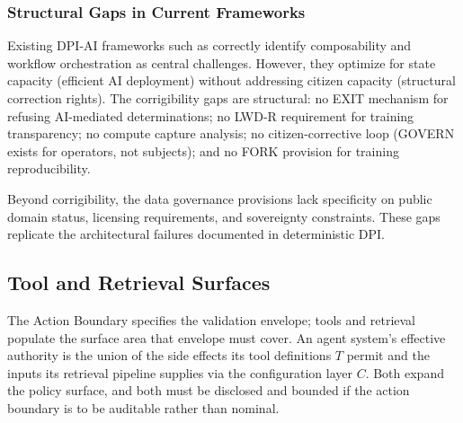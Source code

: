 \documentclass{article}
\theoremstyle{definition}
\begin{document}
\subsubsection{Structural Gaps in Current Frameworks}
\label{subsec:cdpi-critique}

Existing DPI-AI frameworks such as \citet{abadie2026} correctly identify composability and workflow orchestration as central challenges. However, they optimize for state capacity (efficient AI deployment) without addressing citizen capacity (structural correction rights). The corrigibility gaps are structural: no EXIT mechanism for refusing AI-mediated determinations; no LWD-R requirement for training transparency; no compute capture analysis; no citizen-corrective loop (GOVERN exists for operators, not subjects); and no FORK provision for training reproducibility.

Beyond corrigibility, the data governance provisions lack specificity on public domain status, licensing requirements, and sovereignty constraints. These gaps replicate the architectural failures documented in deterministic DPI.

\subsection{Tool and Retrieval Surfaces}
\label{subsec:tool-retrieval-surfaces}

The Action Boundary specifies the validation envelope; tools and retrieval populate the surface area that envelope must cover. An agent system's effective authority is the union of the side effects its tool definitions $T$ permit and the inputs its retrieval pipeline supplies via the configuration layer $C$. Both expand the policy surface, and both must be disclosed and bounded if the action boundary is to be auditable rather than nominal.
\end{document}
